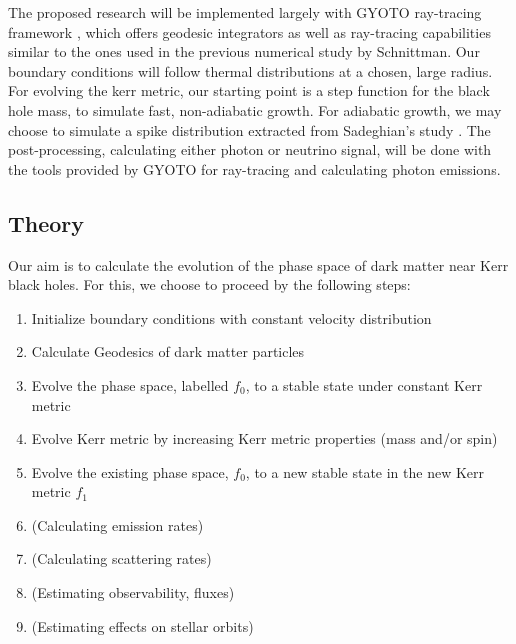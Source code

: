 \documentclass[12pt]{article}
\begin{document}
The proposed research will be implemented largely with GYOTO ray-tracing framework \citep{gyoto_vincent_2011}, which 
offers geodesic integrators as well as ray-tracing capabilities similar to the ones used in the previous numerical study by 
Schnittman. Our boundary conditions will follow thermal distributions at a chosen, large radius. 
For evolving the kerr metric, our starting point is a step function for the black hole mass, to simulate fast, 
non-adiabatic growth. %
For adiabatic growth, we may choose to simulate a spike distribution extracted from Sadeghian's 
study \citep{Sadeghian_Ferrer_Will_2013}. The post-processing, calculating either photon or neutrino signal, 
will be done with the tools provided by GYOTO for ray-tracing and 
calculating photon emissions.

\subsection{Theory}


Our aim is to calculate the evolution of the phase space of dark matter near Kerr black holes. For this, we choose to proceed by the 
following steps:

\begin{enumerate}
 \item Initialize boundary conditions with constant velocity distribution
 \item Calculate Geodesics of dark matter particles
 \item Evolve the phase space, labelled $f_0$, to a stable state under constant Kerr metric %
 \item Evolve Kerr metric by increasing Kerr metric properties (mass and/or spin)
 \item Evolve the existing phase space, $f_0$, to a new stable state in the new Kerr metric $f_1$
 \item (Calculating emission rates) %
 \item (Calculating scattering rates) %
 \item (Estimating observability, fluxes) %
 \item (Estimating effects on stellar orbits) %
\end{enumerate}
\end{document}
